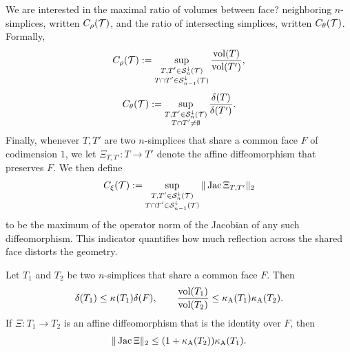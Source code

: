 \documentclass[10pt,a4paper]{article}
\newcommand{\mwl}[1]{{\color{red}#1}}
\begin{document}
We are interested in the maximal ratio of volumes between \mwl{face?} neighboring $n$-simplices, written $C_\rho({\mathcal T})$,
and the ratio of intersecting simplices, written $C_\theta({\mathcal T})$. Formally, 
\begin{align}\label{math:volumeratio}
    C_\rho({\mathcal T}) 
    := 
    \sup_{ \substack{ T, T' \in {\mathcal S}^{\downarrow}_{n}({\mathcal T}) \\ T \cap T' \in {\mathcal S}^{\downarrow}_{n-1}({\mathcal T}) } } 
    \frac{ \operatorname{vol}(T) }{ \operatorname{vol}(T') }
    ,
\end{align}
\begin{align}\label{math:diameterratio}
    C_\theta({\mathcal T}) 
    := 
    \sup_{ \substack{ T, T' \in {\mathcal S}^{\downarrow}_{n}({\mathcal T}) \\ T \cap T' \neq \emptyset } }
    \frac{ {\delta}(T) }{ {\delta}(T') }
    .
\end{align}
Finally, whenever $T, T'$ are two $n$-simplices that share a common face $F$ of codimension $1$, we let $\Xi_{T,T'} : T \rightarrow T'$ denote the affine diffeomorphism 
that preserves $F$. We then define 
\begin{align}\label{math:reflectionmeasure}
    C_\xi({\mathcal T}) 
    := 
    \sup_{ \substack{ T, T' \in {\mathcal S}^{\downarrow}_{n}({\mathcal T}) \\ T \cap T' \in {\mathcal S}^{\downarrow}_{n-1}({\mathcal T}) } }
    \|  \operatorname{{\rm Jac}} \Xi_{T,T'}  \|_{2}
\end{align}
to be the maximum of the operator norm of the Jacobian of any such diffeomorphism. 
This indicator quantifies how much reflection across the shared face distorts the geometry. 



\begin{lemma}\label{lemma:volumecomparison}
    Let $T_1$ and $T_2$ be two $n$-simplices that share a common face $F$. Then 
    \begin{align*}
        {\delta}(T_1)
        \leq 
        \kappa_{}(T_1)
        {\delta}(F)
        ,
        \qquad 
        \frac{ \operatorname{vol}(T_1) }{ \operatorname{vol}(T_2) }
        \leq 
        \kappa_{\rm A}(T_1) \kappa_{\rm A}(T_2)
        .
    \end{align*}
    If $\Xi : T_1 \rightarrow T_2$ is an affine diffeomorphism that is the identity over $F$, then 
    \begin{align*}
        \|  \operatorname{{\rm Jac}} \Xi  \|_{2}
        \leq 
        ( 1 + \kappa_{\rm A}(T_2) ) \kappa_{\rm A}(T_1)
        .
    \end{align*}
\end{lemma}
\end{document}
